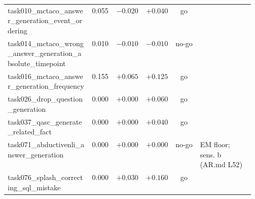 \begin{longtable}{@{}p{0.34\linewidth}rrrcp{0.22\linewidth}@{}}
\scriptsize task010\_\hspace{0pt}mctaco\_\hspace{0pt}answer\_\hspace{0pt}generation\_\hspace{0pt}event\_\hspace{0pt}ordering & \scriptsize 0.055 & \scriptsize $-0.020$ & \scriptsize $+0.040$ & \scriptsize go & \scriptsize  \\
\scriptsize task014\_\hspace{0pt}mctaco\_\hspace{0pt}wrong\_\hspace{0pt}answer\_\hspace{0pt}generation\_\hspace{0pt}absolute\_\hspace{0pt}timepoint & \scriptsize 0.010 & \scriptsize $-0.010$ & \scriptsize $-0.010$ & \scriptsize no-go & \scriptsize  \\
\scriptsize task016\_\hspace{0pt}mctaco\_\hspace{0pt}answer\_\hspace{0pt}generation\_\hspace{0pt}frequency & \scriptsize 0.155 & \scriptsize $+0.065$ & \scriptsize $+0.125$ & \scriptsize go & \scriptsize  \\
\scriptsize task026\_\hspace{0pt}drop\_\hspace{0pt}question\_\hspace{0pt}generation & \scriptsize 0.000 & \scriptsize $+0.000$ & \scriptsize $+0.060$ & \scriptsize go & \scriptsize  \\
\scriptsize task037\_\hspace{0pt}qasc\_\hspace{0pt}generate\_\hspace{0pt}related\_\hspace{0pt}fact & \scriptsize 0.000 & \scriptsize $+0.000$ & \scriptsize $+0.040$ & \scriptsize go & \scriptsize  \\
\scriptsize task071\_\hspace{0pt}abductivenli\_\hspace{0pt}answer\_\hspace{0pt}generation & \scriptsize 0.000 & \scriptsize $+0.000$ & \scriptsize $+0.000$ & \scriptsize no-go & \scriptsize EM floor; sens. b (AR.md L52) \\
\scriptsize task076\_\hspace{0pt}splash\_\hspace{0pt}correcting\_\hspace{0pt}sql\_\hspace{0pt}mistake & \scriptsize 0.000 & \scriptsize $+0.030$ & \scriptsize $+0.160$ & \scriptsize go & \scriptsize  \\

\end{longtable}
